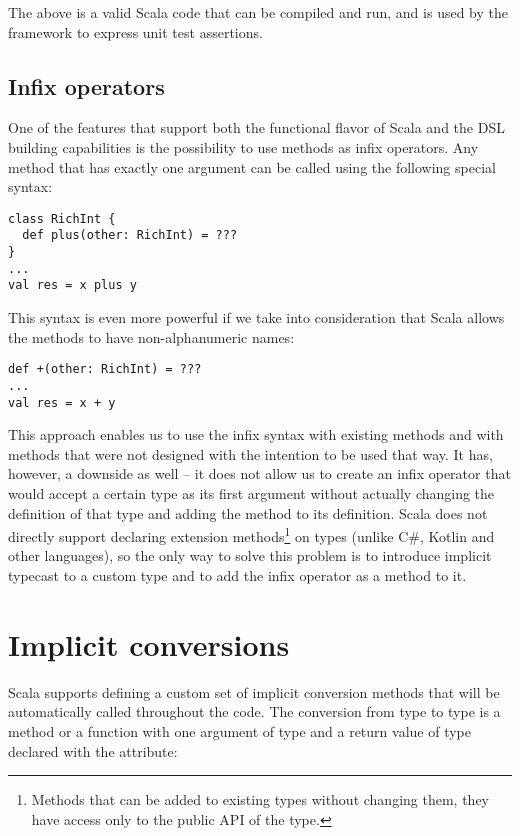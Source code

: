 The above is a valid Scala code that can be compiled and run, and is used by the framework to express unit test assertions.

\subsection{Infix operators}
\label{subsec:infixops}

One of the features that support both the functional flavor of Scala and the DSL building capabilities is the possibility to use methods as infix operators. Any method that has exactly one argument can be called using the following special syntax:

\lstset{style=Scala}
\begin{lstlisting}
class RichInt {
  def plus(other: RichInt) = ???
}
...
val res = x plus y
\end{lstlisting}

This syntax is even more powerful if we take into consideration that Scala allows the methods to have non-alphanumeric names:

\lstset{style=Scala}
\begin{lstlisting}
def +(other: RichInt) = ???
...
val res = x + y
\end{lstlisting}

This approach enables us to use the infix syntax with existing methods and with methods that were not designed with the intention to be used that way. It has, however, a downside as well -- it does not allow us to create an infix operator that would accept a certain type as its first argument without actually changing the definition of that type and adding the method to its definition. Scala does not directly support declaring extension methods\footnote{Methods that can be added to existing types without changing them, they have access only to the public API of the type.} on types (unlike C\#, Kotlin and other languages), so the only way to solve this problem is to introduce implicit typecast to a custom type and to add the infix operator as a method to it.

\section{Implicit conversions}
\label{sec:implicits}

Scala supports defining a custom set of implicit conversion methods that will be automatically called throughout the code. The conversion from type  to type  is a method or a function with one argument of type  and a return value of type  declared with the  attribute:

